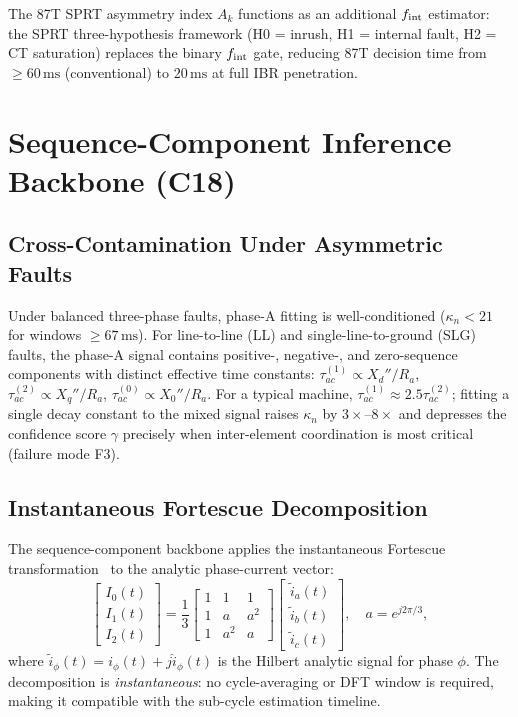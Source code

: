 \documentclass[journal,twoside]{IEEEtran}
\begin{document}
The 87T SPRT asymmetry index $A_k$ functions as an additional $f_{\rm int}$
estimator: the SPRT three-hypothesis framework (H0 = inrush, H1 = internal
fault, H2 = CT saturation) replaces the binary $f_{\rm int}$ gate, reducing
87T decision time from $\geq 60\,\text{ms}$ (conventional) to $20\,\text{ms}$
at full IBR penetration.

\section{Sequence-Component Inference Backbone (C18)}
\label{sec:seq}

\subsection{Cross-Contamination Under Asymmetric Faults}

Under balanced three-phase faults, phase-A fitting is well-conditioned
($\kappa_n < 21$ for windows $\geq 67\,\text{ms}$).
For line-to-line (LL) and single-line-to-ground (SLG) faults, the phase-A
signal contains positive-, negative-, and zero-sequence components with distinct
effective time constants:
$\tau_{ac}^{(1)} \propto X_d''/R_a$,
$\tau_{ac}^{(2)} \propto X_q''/R_a$,
$\tau_{ac}^{(0)} \propto X_0''/R_a$.
For a typical machine, $\tau_{ac}^{(1)} \approx 2.5\tau_{ac}^{(2)}$; fitting a
single decay constant to the mixed signal raises $\kappa_n$ by
$3\times$--$8\times$ and depresses the confidence score $\gamma$ precisely when
inter-element coordination is most critical (failure mode F3).

\subsection{Instantaneous Fortescue Decomposition}

The sequence-component backbone applies the instantaneous Fortescue
transformation~\cite{Fortescue1918} to the analytic phase-current vector:
\begin{equation}
  \begin{bmatrix}I_0(t)\\I_1(t)\\I_2(t)\end{bmatrix}
  = \frac{1}{3}
    \begin{bmatrix}1&1&1\\1&a&a^2\\1&a^2&a\end{bmatrix}
    \begin{bmatrix}\tilde{i}_a(t)\\\tilde{i}_b(t)\\\tilde{i}_c(t)\end{bmatrix},
  \quad a = e^{j2\pi/3},
  \label{eq:fortescue}
\end{equation}
where $\tilde{i}_\phi(t) = i_\phi(t) + j\hat{i}_\phi(t)$ is the Hilbert
analytic signal for phase $\phi$.
The decomposition is \emph{instantaneous}: no cycle-averaging or DFT window is
required, making it compatible with the sub-cycle estimation timeline.
\end{document}
